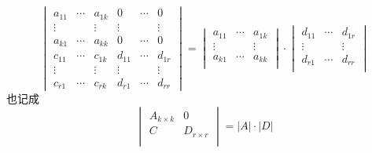 \begin{Corollary}
$$
\begin{vmatrix}
a_{11} & \cdots & a_{1k} & 0      & \cdots & 0 \\
\vdots &        & \vdots & \vdots &        & \vdots \\
a_{k1} & \cdots & a_{kk} & 0      & \cdots & 0 \\
c_{11} & \cdots & c_{1k} & d_{11} & \cdots & d_{1r} \\
\vdots &        & \vdots & \vdots &        & \vdots \\
c_{r1} & \cdots & c_{rk} & d_{r1} & \cdots & d_{rr} 
\end{vmatrix} = \begin{vmatrix}
a_{11} & \cdots & a_{1k}  \\
\vdots &        & \vdots  \\
a_{k1} & \cdots & a_{kk} \\
\end{vmatrix} \cdot
\begin{vmatrix}
d_{11} & \cdots & d_{1r}  \\
\vdots &        & \vdots  \\
d_{r1} & \cdots & d_{rr} \\
\end{vmatrix}
$$
也记成
$$
\begin{vmatrix}
A_{k \times k} & 0 \\
C & D_{r \times r} \\
\end{vmatrix} = |A| \cdot |D|
$$
\end{Corollary}